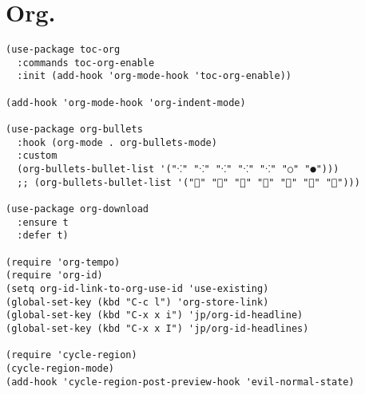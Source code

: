 \documentclass[11pt]{article}
\begin{document}
\section{Org.}
\label{sec:org6670211}
\begin{verbatim}
(use-package toc-org
  :commands toc-org-enable
  :init (add-hook 'org-mode-hook 'toc-org-enable))

(add-hook 'org-mode-hook 'org-indent-mode)

(use-package org-bullets
  :hook (org-mode . org-bullets-mode)
  :custom
  (org-bullets-bullet-list '("⁖" "⁖" "⁖" "⁖" "⁖" "○" "●")))
  ;; (org-bullets-bullet-list '("" "" "" "" "" "" "")))

(use-package org-download
  :ensure t
  :defer t)

(require 'org-tempo)
(require 'org-id)
(setq org-id-link-to-org-use-id 'use-existing)
(global-set-key (kbd "C-c l") 'org-store-link)
(global-set-key (kbd "C-x x i") 'jp/org-id-headline)
(global-set-key (kbd "C-x x I") 'jp/org-id-headlines)

(require 'cycle-region)
(cycle-region-mode)
(add-hook 'cycle-region-post-preview-hook 'evil-normal-state)
\end{verbatim}
\end{document}
